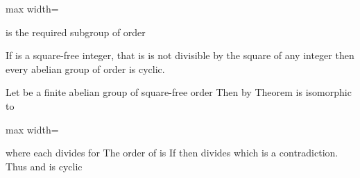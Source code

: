 \documentclass[11pt,oneside]{article}
\begin{document}
\begin{BookBody}
\begin{center}\begin{adjustbox}{max width=\linewidth}\end{adjustbox}\end{center}

\noindent is the required subgroup of order  \BookEnd{\blacklozenge}

 If  is a square-free integer, that is is not divisible by the square of any integer  then every abelian group of order  is cyclic.

 Let  be a finite abelian group of square-free order  Then by Theorem  is isomorphic to

\begin{center}\begin{adjustbox}{max width=\linewidth}\end{adjustbox}\end{center}

\noindent where each  divides  for  The order of  is  If  then  divides  which is a contradiction. Thus  and  is cyclic\BookEnd{\blacklozenge} \BookEnd{\blacksquare}

\end{BookBody}

\BookNarrativefalse
\end{document}
